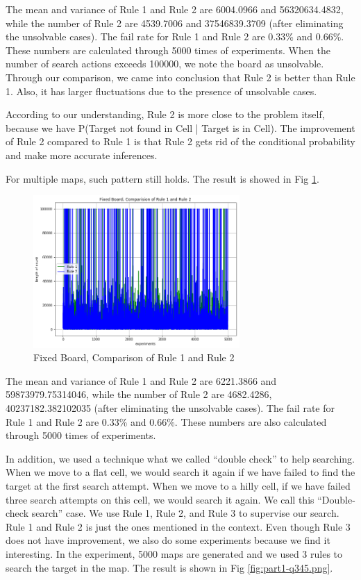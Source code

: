 \documentclass[letter]{article}
\begin{document}
\begin{enumerate}
	\par{The mean and variance of Rule 1 and Rule 2 are 6004.0966 and 56320634.4832, while
	the number of Rule 2 are 4539.7006 and 37546839.3709 (after eliminating the
	unsolvable cases). The fail rate for Rule 1 and Rule 2 are 0.33\% and 0.66\%. These
	numbers are calculated through 5000 times of experiments. When the number of search
	actions exceeds 100000, we note the board as unsolvable. Through our comparison, we
	came into conclusion that Rule 2 is better than Rule 1. Also, it has larger fluctuations due
	to the presence of unsolvable cases.}
	\par{According to our understanding, Rule 2 is more close to the problem itself, because we
	have P(Target not found in Cell | Target is in Cell). The improvement of Rule 2 compared to Rule 1 is that Rule 2 gets rid of the conditional probability and make more accurate inferences.}
	\par{For multiple maps, such pattern still holds. The result is showed in Fig \ref{fig:xzc2}.}
	
	\begin{figure}
		\centering
		\includegraphics[width=0.7\textwidth]{fig/xzc2.png}
		\caption{Fixed Board, Comparison of Rule 1 and Rule 2}
		\label{fig:xzc2}
	\end{figure}
	
	\par{The mean and variance of Rule 1 and Rule 2 are 6221.3866 and 59873979.75314046,
	while the number of Rule 2 are 4682.4286, 40237182.382102035 (after eliminating the
	unsolvable cases). The fail rate for Rule 1 and Rule 2 are 0.33\% and 0.66\%. These
	numbers are also calculated through 5000 times of experiments.}
	
	In addition, we used a technique what we called ``double check'' to help searching. When we move to a flat cell, we would search it again if we have failed to find the target at the first search attempt. When we move to a hilly cell, if we have failed three search attempts on this cell, we would search it again. We call this “Double-check search” case. We use Rule 1, Rule 2, and Rule 3 to supervise our search. Rule 1 and Rule 2 is just the ones mentioned in the context. Even though Rule 3 does not have improvement, we also do some experiments because we find it interesting. In the experiment, 5000 maps are generated and we used 3 rules to search the target in the map. The result is shown in Fig \ref{fig:part1-q345.png}.
	

\end{enumerate}
\end{document}
